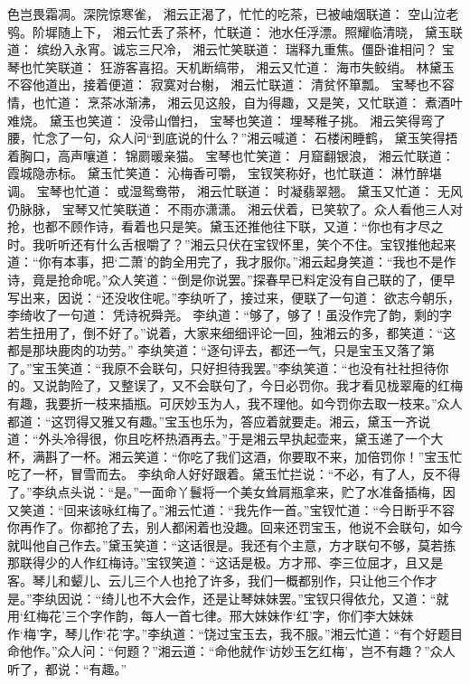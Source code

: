 \documentclass[12pt,oneside]{book}
\begin{document}
色岂畏霜凋。深院惊寒雀，
湘云正渴了，忙忙的吃茶，已被岫烟联道：
空山泣老鸮。阶墀随上下，
湘云忙丢了茶杯，忙联道：
池水任浮漂。照耀临清晓，
黛玉联道：
缤纷入永宵。诚忘三尺冷，
湘云忙笑联道：
瑞释九重焦。僵卧谁相问？
宝琴也忙笑联道：
狂游客喜招。天机断缟带，
湘云又忙道：
海市失鲛绡。
林黛玉不容他道出，接着便道：
寂寞对台榭，
湘云忙联道：
清贫怀箪瓢。
宝琴也不容情，也忙道：
烹茶冰渐沸，
湘云见这般，自为得趣，又是笑，又忙联道：
煮酒叶难烧。
黛玉也笑道：
没帚山僧扫，
宝琴也笑道：
埋琴稚子挑。
湘云笑得弯了腰，忙念了一句，众人问“到底说的什么？”湘云喊道：
石楼闲睡鹤，
黛玉笑得捂着胸口，高声嚷道：
锦罽暖亲猫。
宝琴也忙笑道：
月窟翻银浪，
湘云忙联道：
霞城隐赤标。
黛玉忙笑道：
沁梅香可嚼，
宝钗笑称好，也忙联道：
淋竹醉堪调。
宝琴也忙道：
或湿鸳鸯带，
湘云忙联道：
时凝翡翠翘。
黛玉又忙道：
无风仍脉脉，
宝琴又忙笑联道：
不雨亦潇潇。
湘云伏着，已笑软了。众人看他三人对抢，也都不顾作诗，看着也只是笑。黛玉还推他往下联，又道：“你也有才尽之时。我听听还有什么舌根嚼了？”湘云只伏在宝钗怀里，笑个不住。宝钗推他起来道：“你有本事，把‘二萧’的韵全用完了，我才服你。”湘云起身笑道：“我也不是作诗，竟是抢命呢。”众人笑道：“倒是你说罢。”探春早已料定没有自己联的了，便早写出来，因说：“还没收住呢。”李纨听了，接过来，便联了一句道：
欲志今朝乐，
李绮收了一句道：
凭诗祝舜尧。
李纨道：“够了，够了！虽没作完了韵，剩的字若生扭用了，倒不好了。”说着，大家来细细评论一回，独湘云的多，都笑道：“这都是那块鹿肉的功劳。”
李纨笑道：“逐句评去，都还一气，只是宝玉又落了第了。”宝玉笑道：“我原不会联句，只好担待我罢。”李纨笑道：“也没有社社担待你的。又说韵险了，又整误了，又不会联句了，今日必罚你。我才看见栊翠庵的红梅有趣，我要折一枝来插瓶。可厌妙玉为人，我不理他。如今罚你去取一枝来。”众人都道：“这罚得又雅又有趣。”宝玉也乐为，答应着就要走。湘云，黛玉一齐说道：“外头冷得很，你且吃杯热酒再去。”于是湘云早执起壶来，黛玉递了一个大杯，满斟了一杯。湘云笑道：“你吃了我们这酒，你要取不来，加倍罚你！”宝玉忙吃了一杯，冒雪而去。
李纨命人好好跟着。黛玉忙拦说：“不必，有了人，反不得了。”李纨点头说：“是。”一面命丫鬟将一个美女耸肩瓶拿来，贮了水准备插梅，因又笑道：“回来该咏红梅了。”湘云忙道：“我先作一首。”宝钗忙道：“今日断乎不容你再作了。你都抢了去，别人都闲着也没趣。回来还罚宝玉，他说不会联句，如今就叫他自己作去。”黛玉笑道：“这话很是。我还有个主意，方才联句不够，莫若拣那联得少的人作红梅诗。”宝钗笑道：“这话是极。方才邢、李三位屈才，且又是客。琴儿和颦儿、云儿三个人也抢了许多，我们一概都别作，只让他三个作才是。”李纨因说：“绮儿也不大会作，还是让琴妹妹罢。”宝钗只得依允，又道：“就用‘红梅花’三个字作韵，每人一首七律。邢大妹妹作‘红’字，你们李大妹妹作‘梅’字，琴儿作‘花’字。”李纨道：“饶过宝玉去，我不服。”湘云忙道：“有个好题目命他作。”众人问：“何题？”湘云道：“命他就作‘访妙玉乞红梅’，岂不有趣？”众人听了，都说：“有趣。”
\end{document}
